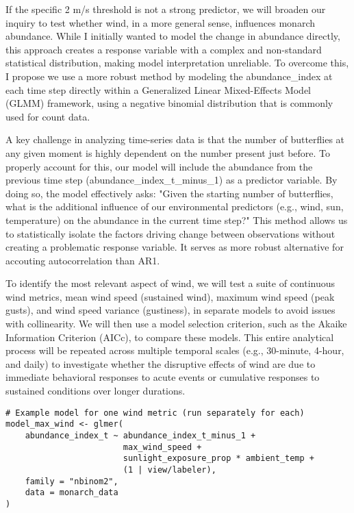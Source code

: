 If the specific 2 m/s threshold is not a strong predictor, we will broaden our inquiry to test whether wind, in a more general sense, influences monarch abundance. While I initially wanted to model the change in abundance directly, this approach creates a response variable with a complex and non-standard statistical distribution, making model interpretation unreliable. To overcome this, I propose we use a more robust method by modeling the abundance_index at each time step directly within a Generalized Linear Mixed-Effects Model (GLMM) framework, using a negative binomial distribution that is commonly used for count data.

A key challenge in analyzing time-series data is that the number of butterflies at any given moment is highly dependent on the number present just before. To properly account for this, our model will include the abundance from the previous time step (abundance_index_t_minus_1) as a predictor variable. By doing so, the model effectively asks: "Given the starting number of butterflies, what is the additional influence of our environmental predictors (e.g., wind, sun, temperature) on the abundance in the current time step?" This method allows us to statistically isolate the factors driving change between observations without creating a problematic response variable. It serves as more robust alternative for accouting autocorrelation than AR1.

To identify the most relevant aspect of wind, we will test a suite of continuous wind metrics, mean wind speed (sustained wind), maximum wind speed (peak gusts), and wind speed variance (gustiness), in separate models to avoid issues with collinearity. We will then use a model selection criterion, such as the Akaike Information Criterion (AICc), to compare these models. This entire analytical process will be repeated across multiple temporal scales (e.g., 30-minute, 4-hour, and daily) to investigate whether the disruptive effects of wind are due to immediate behavioral responses to acute events or cumulative responses to sustained conditions over longer durations.

\begin{verbatim}
# Example model for one wind metric (run separately for each)
model_max_wind <- glmer(
    abundance_index_t ~ abundance_index_t_minus_1 + 
                        max_wind_speed + 
                        sunlight_exposure_prop * ambient_temp +
                        (1 | view/labeler),
    family = "nbinom2",
    data = monarch_data
)
\end{verbatim}

